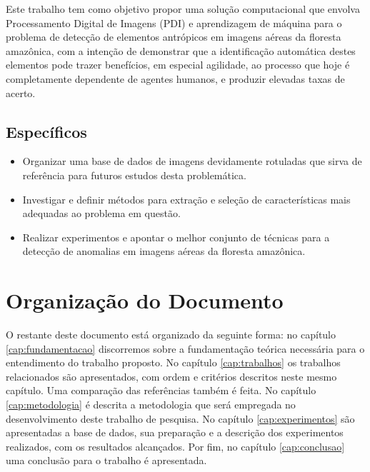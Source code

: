 Este trabalho tem como objetivo propor uma solução computacional que envolva Processamento Digital de Imagens (PDI) e aprendizagem de máquina para o problema de detecção de elementos antrópicos em imagens aéreas da floresta amazônica, com a intenção de demonstrar que a identificação automática destes elementos pode trazer benefícios, em especial agilidade, ao processo que hoje é completamente dependente de agentes humanos, e produzir elevadas taxas de acerto.

\subsection{Específicos}

\begin{itemize}
    \item Organizar uma base de dados de imagens devidamente rotuladas que sirva de referência para futuros estudos desta problemática.
    \item Investigar e definir métodos para extração e seleção de características mais adequadas ao problema em questão.
    \item Realizar experimentos e apontar o melhor conjunto de técnicas para a detecção de anomalias em imagens aéreas da floresta amazônica.
\end{itemize}

\section{Organização do Documento}

O restante deste documento está organizado da seguinte forma: no capítulo \ref{cap:fundamentacao} discorremos sobre a fundamentação teórica necessária para o entendimento do trabalho proposto. No capítulo \ref{cap:trabalhos} os trabalhos relacionados são apresentados, com ordem e critérios descritos neste mesmo capítulo. Uma comparação das referências também é feita. No capítulo \ref{cap:metodologia} é descrita a metodologia que será empregada no desenvolvimento deste trabalho de pesquisa. No capítulo \ref{cap:experimentos} são apresentadas a base de dados, sua preparação e a descrição dos experimentos realizados, com os resultados alcançados. Por fim, no capítulo \ref{cap:conclusao} uma conclusão para o trabalho é apresentada.
